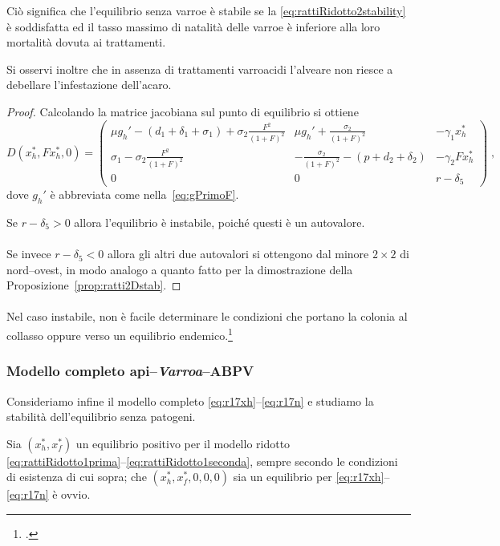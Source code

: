 Ciò significa che l'equilibrio senza varroe è stabile se la \eqref{eq:rattiRidotto2stability} è soddisfatta
ed il tasso massimo di natalità delle varroe è inferiore alla loro mortalità dovuta ai trattamenti.

Si osservi inoltre che in assenza di trattamenti varroacidi l'alveare non riesce a debellare l'infestazione dell'acaro.

\begin{proof}
Calcolando la matrice jacobiana sul punto di equilibrio si ottiene
$$ D (x_h^* , F x_h^* , 0) =
\begin{pmatrix}
    \mu g_h' - (d_1 +\delta_1 +\sigma_1) + \sigma_2 \frac{F^2}{(1+F)^2} &
    \mu g_h' + \frac{\sigma_2}{(1+F)^2} &
    -\gamma_1 x_h^*
    \\
    \sigma_1 - \sigma_2 \frac{F^2}{(1+F)^2} &
    - \frac{\sigma_2}{(1+F)^2} - ( p +d_2 +\delta_2) &
    - \gamma_2 F x_h^*
    \\
    0 &
    0 &
    r -\delta_5
    \end{pmatrix}
    \; ,
$$
dove $g_h'$ è abbreviata come nella~\eqref{eq:gPrimoF}.

Se $r -\delta_5 > 0$ allora l'equilibrio è instabile, poiché questi è un autovalore.

\paragraph{}
Se invece $r - \delta_5 <0$ allora gli altri due autovalori si ottengono dal minore $2 \times 2$
di nord--ovest, in modo analogo a quanto fatto
per la dimostrazione della Proposizione~\ref{prop:ratti2Dstab}.
\end{proof}

\paragraph{}
Nel caso instabile, non è facile determinare le condizioni che portano la colonia al collasso oppure
verso un equilibrio endemico.\footcite[15]{ratti2017}


\subsubsection{Modello completo api--\emph{Varroa}--ABPV}
Consideriamo infine il modello completo \eqref{eq:r17xh}--\eqref{eq:r17n} e studiamo la stabilità dell'equilibrio senza patogeni.

Sia $(x_h^*, x_f^*)$ un equilibrio positivo per il modello ridotto \eqref{eq:rattiRidotto1prima}--\eqref{eq:rattiRidotto1seconda}, sempre secondo le condizioni di esistenza di cui sopra; che $(x_h^*, x_f^*, 0,0,0)$ sia un equilibrio per \eqref{eq:r17xh}--\eqref{eq:r17n} è ovvio.

